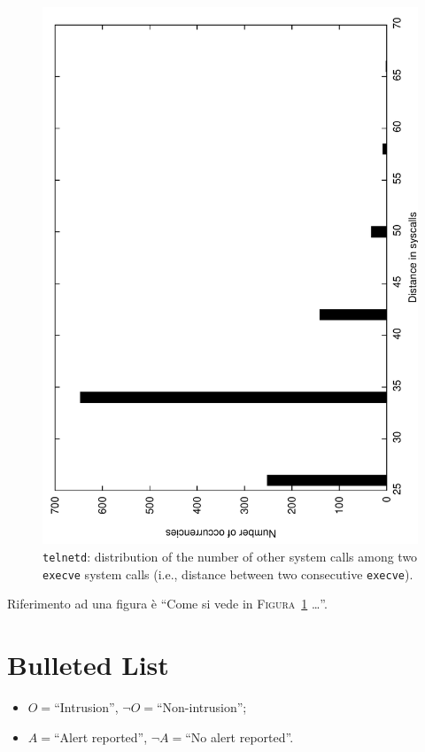 \begin{figure}[h]
\centering
\includegraphics[angle=-90,width=.8\textwidth]{Figures/telnet.pdf}
\caption{\texttt{telnetd}: distribution of the number of other system calls among two \texttt{execve} system calls (i.e., distance between two consecutive \texttt{execve}).}
\label{fig:exectelnet} %
\end{figure}

Riferimento ad una figura è  ``Come si vede in \textsc{Figura~\ref{fig:exectelnet}} \ldots''.



\section{Bulleted List}

\begin{itemize}
\item $O = $``Intrusion'', $\neg O =$``Non-intrusion'';
\item $A = $``Alert reported'', $\neg A =$``No alert reported''.
\end{itemize}

